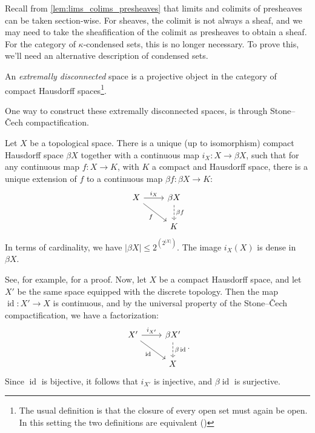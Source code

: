 \documentclass{article}
\DeclareMathOperator{\id}{id}
\begin{document}
\medskip
Recall from \cref{lem:lims_colims_presheaves} that limits and colimits
of presheaves can be taken section-wise. For sheaves, the colimit is
not always a sheaf, and we may need to take the sheafification of the
colimit as presheaves to obtain a sheaf. For the category of
$\kappa$-condensed sets, this is no longer necessary. To
prove this, we'll need an alternative description of condensed sets.
\begin{definition}
    An \emph{extremally disconnected} space is a projective object
    in the category of compact Hausdorff spaces\footnote{
        The usual definition is that the closure of
        every open set must again be open. In this setting
        the two definitions are equivalent
        (\cite[Theorem 2.5]{Gle1958ProjectiveTS})}.
\end{definition}
One way to construct these extremally disconnected spaces, is
through Stone--\v{C}ech compactification.
\begin{theorem}
    Let $X$ be a topological space. There is a unique (up to isomorphism)
    compact Hausdorff space $\beta X$ together with a continuous map
    $i_X \colon X \to \beta X$, such that for any continuous map
    $f \colon X \to K$, with $K$ a compact and Hausdorff space, there is
    a unique extension of $f$ to a continuous map $\beta f \colon \beta X \to K$:
    \begin{equation*}
        \begin{tikzcd}
            X \rar["i_X"] \ar[rd, "f"'] & \beta X  \dar[dashed, "\beta f"]\\
            & K
        \end{tikzcd}
    \end{equation*}
    In terms of cardinality, we have $|\beta X| \leq 2^{\left(2^{|X|}\right)}$.
    The image $i_{X}(X)$ is dense in $\beta X$.
\end{theorem}
See, for example, \cite[\href{https://stacks.math.columbia.edu/tag/0908}{Section 0908}]{stacks-project}
for a proof. Now, let $X$ be a compact Hausdorff space,
and let $X'$ be the same space equipped with the discrete topology.
Then the map $\id \colon X' \to X$ is continuous, and by
the universal property of the Stone--\v{C}ech compactification,
we have a factorization:
\begin{equation*}
    \begin{tikzcd}
        X' \rar["i_{X'}"] \ar[rd, "\id"'] & \beta X ' \dar[dashed, "\beta \id"]\\
        & X
    \end{tikzcd}.
\end{equation*}
Since $\id$ is bijective, it follows
that $i_{X'}$ is injective, and $\beta \id$ is surjective.
\end{document}
